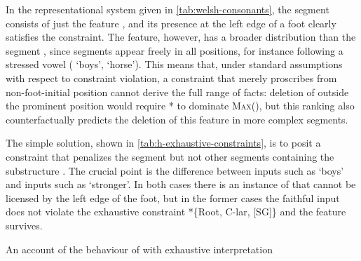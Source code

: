 In the representational system given in \cref{tab:welsh-consonants}, the segment \ipa{[h]} consists of just the feature , and its presence at the left edge of a foot clearly satisfies the constraint. The feature, however, has a broader distribution than the segment \ipa{[h]}, since  segments appear freely in all positions, for instance following a stressed vowel (\ipa{[ˈkrute]} `boys', \ipa{[ˈkeːfil]} `horse'). This means that, under standard assumptions with respect to constraint violation, a constraint that merely proscribes  from non\hyp foot\hyp initial position cannot derive the full range of facts: deletion of \ipa{[h]} outside the prominent position would require * to dominate \textsc{Max}(), but this ranking also counterfactually predicts the deletion of this feature in more complex segments.

The simple solution, shown in \cref{tab:h-exhaustive-constraints}, is to posit a constraint that penalizes the segment \ipa{[h]} but not other segments containing the substructure . The crucial point is the difference between inputs such as  `boys' and inputs such as  `stronger'. In both cases there is an instance of  that cannot be licensed by the left edge of the foot, but in the former cases the faithful input \ipa{[ˈkrute]} does not violate the exhaustive constraint *\{Root, C-lar, [SG]\} and the feature survives.

\begin{table}
  \centering
  \begin{OTmultitableau}{5}
\OTmcandrow[/krute/][\OThand]{[ˈ(kru)te]}{,,,,*}
\OTmcandrow{[ˈ(kruː)de]}{,,,*!,}
\OTmcandrow{[me(ˈeːvin)]}{*!,,,*,}
\end{OTmultitableau}
  \caption{An account of the behaviour of \ipa{[h]} with exhaustive interpretation}
  \label{tab:h-exhaustive-constraints}
\end{table}

